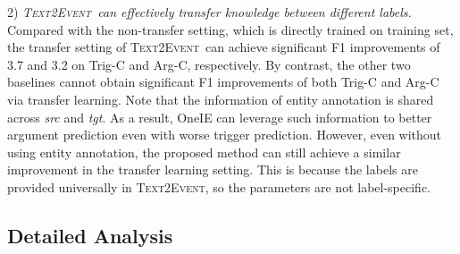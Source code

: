 \documentclass[11pt,a4paper]{article}
\newcommand\modelname{\textsc{Text2Event}}
\begin{document}
2) \textit{\modelname\, can effectively transfer knowledge between different labels.}
Compared with the non-transfer setting, which is directly trained on  training set, the transfer setting of \modelname\, can achieve significant F1 improvements of 3.7 and 3.2 on Trig-C and Arg-C, respectively.
By contrast, the other two baselines cannot obtain significant F1 improvements of both Trig-C and Arg-C via transfer learning.
Note that the information of entity annotation is shared across \textit{src} and \textit{tgt}.
As a result, OneIE can leverage such information to better argument prediction even with worse trigger prediction.
However, even without using entity annotation, the proposed method can still achieve a similar improvement in the transfer learning setting.
This is because the labels are provided universally in \modelname, so the parameters are not label-specific.

\subsection{Detailed Analysis}
\end{document}
